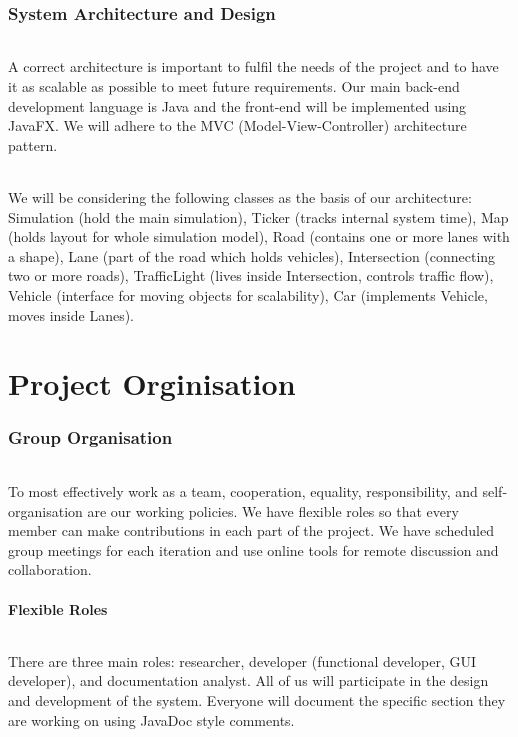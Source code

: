 \documentclass[11pt, a4paper]{article}
\begin{document}
\section{System Architecture and Design}\label{arch:desgn}
\paragraph{}
A correct architecture is important to fulfil the needs of the project and to have it as scalable as possible to meet future requirements. Our main back-end development language is Java and the front-end will be implemented using JavaFX. We will adhere to the MVC (Model-View-Controller) architecture pattern.
\paragraph{}
We will be considering the following classes as the basis of our architecture: Simulation (hold the main simulation), Ticker (tracks internal system time), Map (holds layout for whole simulation model), Road (contains one or more lanes with a shape), Lane (part of the road which holds vehicles), Intersection (connecting two or more roads), TrafficLight (lives inside Intersection, controls traffic flow), Vehicle (interface for moving objects for scalability), Car (implements Vehicle, moves inside Lanes).

\part*{Project Orginisation}
\section{Group Organisation}\label{proj:org}
\paragraph{}
To most effectively work as a team, cooperation, equality, responsibility, and self-organisation are our working policies. We have flexible roles so that every member can make contributions in each part of the project. We have scheduled group meetings for each iteration and use online tools for remote discussion and collaboration.

\subsection{Flexible Roles}\label{roles}
\paragraph{}
There are three main roles: researcher, developer (functional developer, GUI developer), and documentation analyst. All of us will participate in the design and development of the system. Everyone will document the specific section they are working on using JavaDoc style comments.
\end{document}
